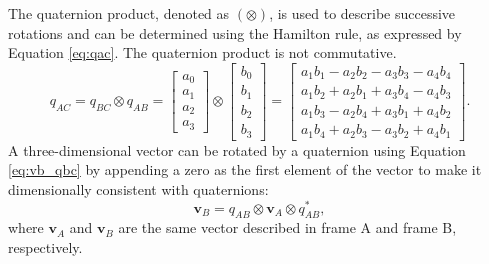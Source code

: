 The quaternion product, denoted as \( (\otimes) \), is used to describe successive rotations and can be determined using the Hamilton rule, as expressed by Equation \eqref{eq:qac}. The quaternion product is not commutative.
\begin{equation}
q_{AC} = q_{BC} \otimes q_{AB} = \begin{bmatrix} 
    a_0 \\ 
    a_1 \\ 
    a_2 \\ 
    a_3 
\end{bmatrix} \otimes \begin{bmatrix} 
    b_0 \\ 
    b_1 \\ 
    b_2 \\ 
    b_3 
\end{bmatrix} = \begin{bmatrix} 
    a_1b_1 - a_2b_2 - a_3b_3 - a_4b_4 \\ 
    a_1b_2 + a_2b_1 + a_3b_4 - a_4b_3 \\ 
    a_1b_3 - a_2b_4 + a_3b_1 + a_4b_2 \\ 
    a_1b_4 + a_2b_3 - a_3b_2 + a_4b_1 
\end{bmatrix}.  \label{eq:qac}
\end{equation}
A three-dimensional vector can be rotated by a quaternion using Equation \eqref{eq:vb_qbc} by appending a zero as the first element of the vector to make it dimensionally consistent with quaternions:
\begin{equation}
    \mathbf{v}_B = q_{AB} \otimes \mathbf{v}_A \otimes q_{AB}^*,    \label{eq:vb_qbc}
\end{equation}
where \( \mathbf{v}_A \) and \( \mathbf{v}_B \) are the same vector described in frame A and frame B, respectively.

